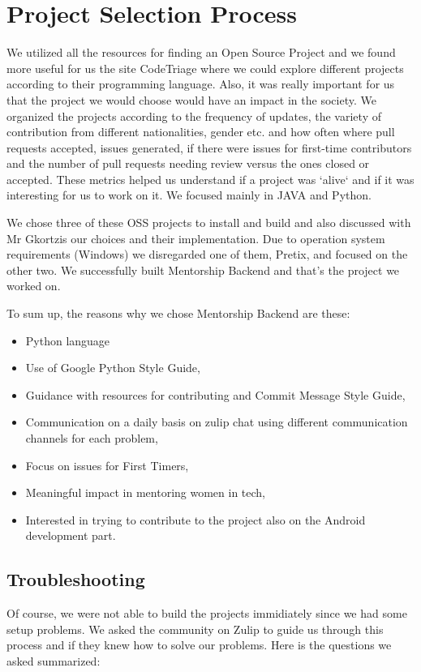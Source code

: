\documentclass{article}
\begin{document}
\section{Project Selection Process}

\hspace{0.5cm}We utilized all the resources for finding an Open Source Project and we found more useful for us the site CodeTriage where we could explore different projects according to their programming language. Also, it was really important for us that the project we would choose would have an impact in the society.
We organized the projects according to the frequency of updates, the variety of contribution from different nationalities, gender etc. and how often where pull requests accepted, issues generated, if there were issues for first-time contributors and the number of pull requests needing review versus the ones closed or accepted. These metrics helped us understand if a project was `alive` and if it was interesting for us to work on it. We focused mainly in JAVA and Python. 

We chose three of these OSS projects to install and build and also discussed with Mr Gkortzis our choices and their implementation. Due to operation system requirements (Windows) we disregarded one of them, Pretix, and focused on the other two. We successfully built Mentorship Backend and that’s the project we worked on.

To sum up, the reasons why we chose Mentorship Backend are these:
\begin{itemize}
  \item Python language 
  \item Use of Google Python Style Guide,
  \item Guidance with resources for contributing and  Commit Message Style Guide,
  \item Communication on a daily basis on zulip chat using different communication channels for each problem,
  \item Focus on issues for First Timers,
  \item Meaningful impact in mentoring women in tech,
  \item Interested in trying to contribute to the project also on the Android development part.
\end{itemize}

\subsection{Troubleshooting}
Of course, we were not able to build the projects immidiately since we had some setup problems. We asked the community on Zulip to guide us through this process and if they knew how to solve our problems. Here is the questions we asked summarized:
\end{document}
